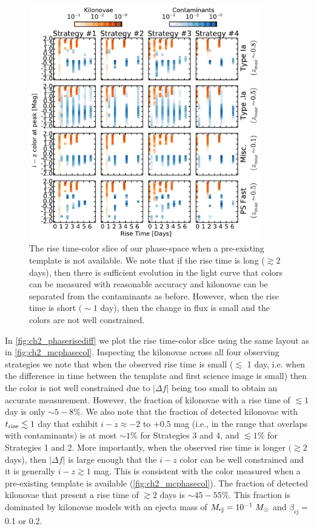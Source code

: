 \begin{figure}[t!]
\centering
\includegraphics[width=0.9\textwidth]{./figs/chapter2/ch2_f14.pdf}
\caption{The rise time-color slice of our phase-space when a pre-existing template is not available. We note that if the rise time is long ($\gtrsim2$ days), then there is sufficient evolution in the light curve that colors can be measured with reasonable accuracy and kilonovae can be separated from the contaminants as before. However, when the rise time is short $(\sim 1$ day), then the change in flux is small and the colors are not well constrained.}
\label{fig:ch2_phaserisediff}
\end{figure}

In \autoref{fig:ch2_phaserisediff} we plot the rise time-color slice using the same layout as in \autoref{fig:ch2_mcphasecol}. Inspecting the kilonovae across all four observing strategies we note that when the observed rise time is small ($\lesssim$ 1 day, i.e. when the difference in time between the template and first science image is small) then the color is not well constrained due to $|\Delta f|$ being too small to obtain an accurate measurement. However, the fraction of kilonovae with a rise time of $\lesssim1$ day is only $\sim5-8\%$. We also note that the fraction of detected kilonovae with $t_{{\rm rise}} \lesssim 1$ day that exhibit $i-z\approx -2$ to $+0.5$ mag (i.e., in the range that overlaps with contaminants) is at most $\sim1\%$ for Strategies 3 and 4, and $\lesssim1\%$ for Strategies 1 and 2. More importantly, when the observed rise time is longer $(\gtrsim 2$ days), then $|\Delta f|$ is large enough that the $i-z$ color can be well constrained and it is generally $i-z\gtrsim1$ mag. This is consistent with the color measured when a pre-existing template is available (\autoref{fig:ch2_mcphasecol}). The fraction of detected kilonovae that present a rise time of $\gtrsim 2$ days is $\sim45-55\%$. This fraction is dominated by kilonovae models with an ejecta mass of $M_{\rm ej} = 10^{-1} \;M_{\odot}$ and $\beta_{\text{ej}} = $ 0.1 or 0.2.

